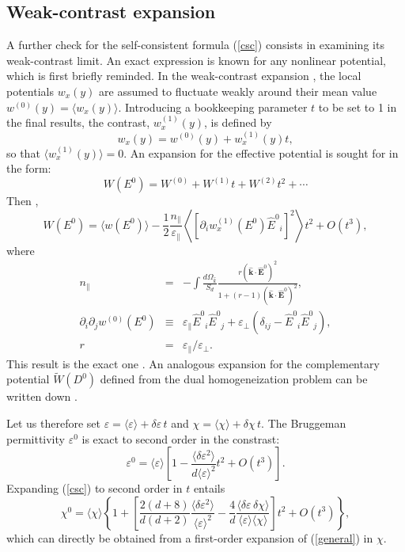\subsection{Weak-contrast expansion}
A further check for the self-consistent formula (\ref{csc}) consists
in examining its weak-contrast limit. An exact expression is known
for any nonlinear potential, which is first briefly reminded. In
the weak-contrast expansion \cite{BLUM89,PONT92,PONT97,BART98},
the local potentials $w_x(y)$ are assumed to fluctuate weakly
around their mean value $w^{(0)}(y)=\langle w_x(y)\rangle$.
Introducing a bookkeeping parameter $t$ to be set to 1 in the
final results, the contrast, $w^{(1)}_x(y)$, is defined by
\begin{equation}
w_x(y)=w^{(0)}(y)+w^{(1)}_x(y)t,
\end{equation}
so that $\langle w^{(1)}_x(y)\rangle=0$. An expansion for the
effective potential is sought for in the form:
\begin{equation}
W(E^0)=W^{(0)}+W^{(1)}t+W^{(2)}t^2+\cdots
\end{equation}
Then \cite{PONT97},
\begin{equation}
\label{general}
W(E^0)=\langle w(E^0)\rangle-\frac{1}{2}\frac{n_\parallel}
{\varepsilon_\parallel}\left\langle\left[\partial_i w_x^{(1)} (E^0) {\hat{E}^0}_i\right]^2\right\rangle t^2+ O(t^3),
\end{equation}
where
\begin{eqnarray}
\label{depol}
n_\parallel&=&-\int \frac{d\Omega_{\hat{k}}}{S_d}
\frac{r ({\mathbf\hat{k}}\cdot{\mathbf\hat{E}}^0)^2}
{1+(r-1)({\mathbf\hat{k}}\cdot{\mathbf\hat{E}}^0)^2},\\
\partial_i\partial_j w^{(0)}(E^0)&\equiv&
\varepsilon_\parallel{\hat{E}^0}_i{\hat{E}^0}_j
+\varepsilon_\perp(\delta_{ij}-{\hat{E}^0}_i{\hat{E}^0}_j),\\
r&=&\varepsilon_\parallel/\varepsilon_\perp.
\end{eqnarray}
This result is the exact one \cite{PONT97}. An analogous
expansion for the complementary potential $\tilde{W}(D^0)$
defined from the dual homogeneization problem can be written
down \cite{PONT97,BART98}.

Let us therefore set $\varepsilon=\langle \varepsilon\rangle
+\delta\varepsilon\, t$ and $\chi=\langle \chi\rangle+
\delta\chi\,t$. The Bruggeman permittivity $\varepsilon^0$
is exact to second order in the constrast:
\begin{equation}
\varepsilon^0=\langle \varepsilon\rangle
\left[1-\frac{\langle\delta\varepsilon^2\rangle} {d\langle\varepsilon\rangle^2}t^2+O(t^3)\right].
\end{equation}
Expanding (\ref{csc}) to second order in $t$ entails
\cite{BART98}
\begin{equation}
\label{wnlwc}
\chi^0=\langle\chi\rangle
\left\{1+\left[\frac{2(d+8)}{d(d+2)} \frac{\langle\delta\varepsilon^2\rangle} {\langle\varepsilon\rangle^2}-\frac{4}{d} \frac{\langle\delta\varepsilon\,\delta\chi\rangle} {\langle\varepsilon\rangle\langle\chi\rangle}\right]t^2
+O(t^3)\right\},
\end{equation}
which can directly be obtained from a first-order
expansion of (\ref{general}) in $\chi$.

